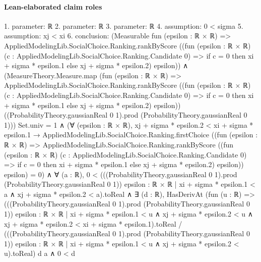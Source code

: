 \documentclass[10pt]{article}
\begin{document}
\paragraph{Lean-elaborated claim roles}\begin{ReviewVerbatim}
1. parameter: ℝ
2. parameter: ℝ
3. parameter: ℝ
4. assumption: 0 < sigma
5. assumption: xj < xi
6. conclusion: (Measurable fun (epsilon : ℝ × ℝ) =>
    AppliedModelingLib.SocialChoice.Ranking.rankByScore
      ((fun (epsilon : ℝ × ℝ) (c : AppliedModelingLib.SocialChoice.Ranking.Candidate 0) =>
          if c = 0 then xi + sigma * epsilon.1 else xj + sigma * epsilon.2)
        epsilon)) ∧
  (MeasureTheory.Measure.map
          (fun (epsilon : ℝ × ℝ) =>
            AppliedModelingLib.SocialChoice.Ranking.rankByScore
              ((fun (epsilon : ℝ × ℝ) (c : AppliedModelingLib.SocialChoice.Ranking.Candidate 0) =>
                  if c = 0 then xi + sigma * epsilon.1 else xj + sigma * epsilon.2)
                epsilon))
          ((ProbabilityTheory.gaussianReal 0 1).prod (ProbabilityTheory.gaussianReal 0 1)))
        Set.univ =
      1 ∧
    (∀ (epsilon : ℝ × ℝ),
        xj + sigma * epsilon.2 < xi + sigma * epsilon.1 →
          AppliedModelingLib.SocialChoice.Ranking.firstChoice
              ((fun (epsilon : ℝ × ℝ) =>
                  AppliedModelingLib.SocialChoice.Ranking.rankByScore
                    ((fun (epsilon : ℝ × ℝ) (c : AppliedModelingLib.SocialChoice.Ranking.Candidate 0) =>
                        if c = 0 then xi + sigma * epsilon.1 else xj + sigma * epsilon.2)
                      epsilon))
                epsilon) =
            0) ∧
      ∀ (a : ℝ),
        0 <
            (((ProbabilityTheory.gaussianReal 0 1).prod (ProbabilityTheory.gaussianReal 0 1))
                {epsilon : ℝ × ℝ | xi + sigma * epsilon.1 < a ∧ xj + sigma * epsilon.2 < a}).toReal ∧
          ∃ (d : ℝ),
            HasDerivAt
                (fun (u : ℝ) =>
                  (((ProbabilityTheory.gaussianReal 0 1).prod (ProbabilityTheory.gaussianReal 0 1))
                        {epsilon : ℝ × ℝ |
                          xi + sigma * epsilon.1 < u ∧
                            xj + sigma * epsilon.2 < u ∧ xj + sigma * epsilon.2 < xi + sigma * epsilon.1}).toReal /
                    (((ProbabilityTheory.gaussianReal 0 1).prod (ProbabilityTheory.gaussianReal 0 1))
                        {epsilon : ℝ × ℝ | xi + sigma * epsilon.1 < u ∧ xj + sigma * epsilon.2 < u}).toReal)
                d a ∧
              0 < d
\end{ReviewVerbatim}
\end{document}
